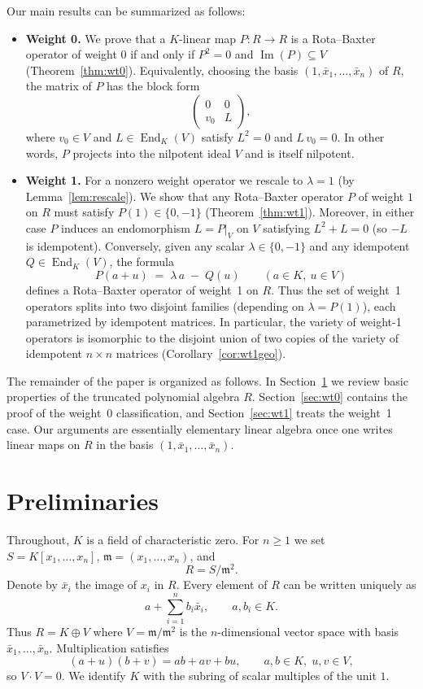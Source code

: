 \documentclass[a4paper,11pt]{elsarticle}
\theoremstyle{definition}
\theoremstyle{remark}
\DeclareMathOperator{\End}{End}
\DeclareMathOperator{\im}{Im}
\newcommand{\m}{\mathfrak{m}}
\begin{document}
Our main results can be summarized as follows:
\begin{itemize}
\item {\bf Weight 0.}  We prove that a $K$-linear map $P:R\to R$ is a Rota--Baxter operator of weight $0$ if and only if $P^2=0$ and $\im(P)\subseteq V$ (Theorem~\ref{thm:wt0}).  Equivalently, choosing the basis $(1,\bar x_1,\dots,\bar x_n)$ of $R$, the matrix of $P$ has the block form 
\[
\begin{pmatrix} 0 & 0 \\ v_0 & L \end{pmatrix},
\]
where $v_0\in V$ and $L\in\End_K(V)$ satisfy $L^2=0$ and $L\,v_0=0$.  In other words, $P$ projects into the nilpotent ideal $V$ and is itself nilpotent.

\item {\bf Weight 1.}  For a nonzero weight operator we rescale to $\lambda=1$ (by Lemma~\ref{lem:rescale}).  We show that any Rota--Baxter operator $P$ of weight $1$ on $R$ must satisfy $P(1)\in\{0,-1\}$ (Theorem~\ref{thm:wt1}).  Moreover, in either case $P$ induces an endomorphism $L=P|_V$ on $V$ satisfying $L^2+L=0$ (so $-L$ is idempotent).  Conversely, given any scalar $\lambda\in\{0,-1\}$ and any idempotent $Q\in \End_K(V)$, the formula
\[
P(a+u)\;=\;\lambda\,a \;-\;Q(u)\qquad (a\in K,\ u\in V)
\]
defines a Rota--Baxter operator of weight~1 on $R$.  Thus the set of weight~1 operators splits into two disjoint families (depending on $\lambda=P(1)$), each parametrized by idempotent matrices.  In particular, the variety of weight-1 operators is isomorphic to the disjoint union of two copies of the variety of idempotent $n\times n$ matrices (Corollary~\ref{cor:wt1geo}).

\end{itemize}

The remainder of the paper is organized as follows.  In Section~\ref{sec:prelim} we review basic properties of the truncated polynomial algebra $R$.  Section~\ref{sec:wt0} contains the proof of the weight~0 classification, and Section~\ref{sec:wt1} treats the weight~1 case. Our arguments are essentially elementary linear algebra once one writes linear maps on $R$ in the basis $(1,\bar x_1,\dots,\bar x_n)$.  


\section{Preliminaries}\label{sec:prelim}

Throughout, $K$ is a field of characteristic zero.
For $n \ge 1$ we set $S = K[x_1,\dots,x_n]$, $\m = (x_1,\dots,x_n)$, and
\[
R = S / \m^2.
\]
Denote by $\bar x_i$ the image of $x_i$ in $R$.  Every element of $R$ can be written uniquely as
\[
a + \sum_{i=1}^n b_i \bar x_i, \qquad a, b_i \in K.
\]
Thus $R = K \oplus V$ where $V = \m/\m^2$ is the $n$-dimensional vector space with basis $\bar x_1,\dots,\bar x_n$.  Multiplication satisfies
\[
(a+u)(b+v) = ab + av + bu, \qquad a,b \in K,\; u,v \in V,
\]
so $V \cdot V = 0$. We identify $K$ with the subring of scalar multiples of the unit $1$.
\end{document}
